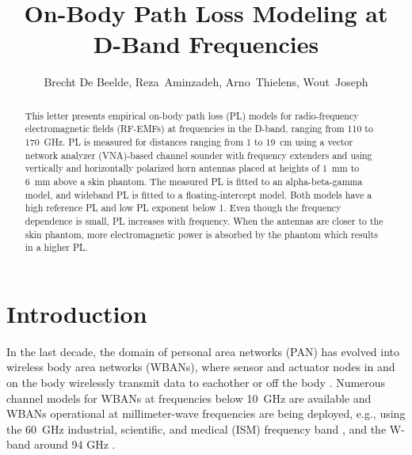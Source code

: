 \documentclass[preprint]{rsl}
\title{On-Body Path Loss Modeling at D-Band Frequencies}
\author{Brecht De Beelde,
Reza~Aminzadeh,
Arno~Thielens,
Wout~Joseph
}
\begin{document}
\maketitle

%
%

\begin{abstract}
This letter presents empirical on-body path loss (PL) models for radio-frequency electromagnetic fields (RF-EMFs) at frequencies in the D-band, ranging from 110 to 170~GHz. 
PL is measured for distances ranging from 1 to 19~cm using a vector network analyzer (VNA)-based channel sounder with frequency extenders and using vertically and horizontally polarized horn antennas placed at heights of 1~mm to 6~mm above a skin phantom.
The measured PL is fitted to an alpha-beta-gamma model, and wideband PL is fitted to a floating-intercept model.
Both models have a high reference PL and low PL exponent below 1. 
Even though the frequency dependence is small, PL increases with frequency. 
When the antennas are closer to the skin phantom, more electromagnetic power is absorbed by the phantom which results in a higher PL.
\end{abstract}

\section{Introduction\label{sect:intro}}

In the last decade, the domain of personal area networks (PAN) has evolved into wireless body area networks (WBANs), where sensor and actuator nodes in and on the body  wirelessly transmit data to eachother \cite{Patel2010,Reusens2009} or off the body \cite{Marinova2015}. 
Numerous channel models for WBANs at frequencies below 10~GHz are available \cite{VanRoy2010,Qaraqe2014} and WBANs operational at millimeter-wave frequencies are being deployed, e.g., using the 60~GHz industrial, scientific, and medical (ISM) frequency band \cite{Chahat2013,Petrillo2014,Aminzadeh2021_tap}, and the W-band around 94 GHz \cite{Brizzi2013,Ali2022}.
\end{document}
